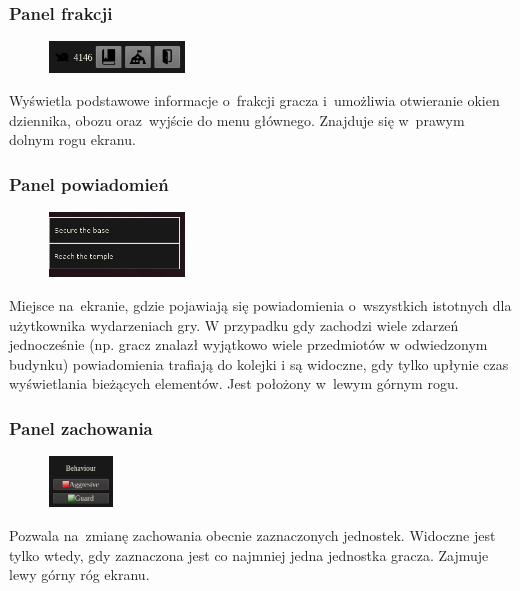 \documentclass[licencjacka]{pracamgr}
\begin{document}
      \subsubsection{Panel frakcji}
        \begin{figure}
          \vspace{-10pt}
          \includegraphics[width=0.32\textwidth]{PanelFrakcji}
          \vspace{-10pt}
        \end{figure}
        Wyświetla podstawowe informacje o~frakcji gracza i~umożliwia otwieranie okien dziennika, obozu oraz~wyjście do
        menu głównego. Znajduje się w~prawym dolnym rogu ekranu.

      \subsubsection{Panel powiadomień}
        \begin{figure}
          \vspace{-10pt}
          \includegraphics[width=0.32\textwidth]{PanelNotyfikacji}
          \vspace{-10pt}
        \end{figure}
        Miejsce na~ekranie, gdzie pojawiają się powiadomienia o~wszystkich istotnych dla użytkownika wydarzeniach gry.
        W przypadku gdy zachodzi wiele zdarzeń jednocześnie (np. gracz znalazł wyjątkowo wiele przedmiotów w odwiedzonym 
        budynku) powiadomienia trafiają do kolejki i są widoczne, gdy tylko upłynie czas wyświetlania bieżących elementów. 
        Jest położony w~lewym górnym rogu.

      \subsubsection{Panel zachowania}
        \begin{figure}
          \vspace{-10pt}
          \includegraphics[width=0.15\textwidth]{PanelZachowania}
          \vspace{-10pt}
        \end{figure}
        Pozwala na~zmianę zachowania obecnie zaznaczonych jednostek. Widoczne jest tylko wtedy, gdy zaznaczona jest co
        najmniej jedna jednostka gracza. Zajmuje lewy górny róg ekranu.
\end{document}
